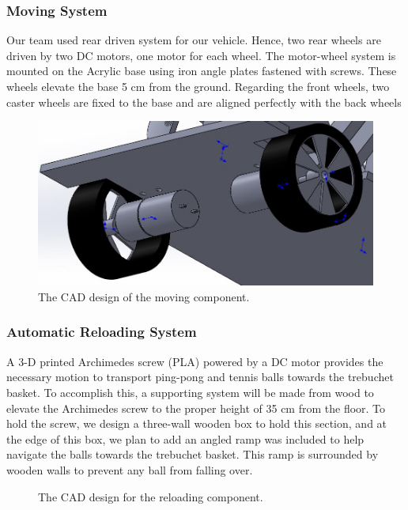 \documentclass{article}
\begin{document}
\subsubsection*{Moving System}
Our team used rear driven system for our vehicle. Hence, two rear wheels are driven by two DC motors, one motor for each wheel. The motor-wheel system is mounted on the Acrylic base using iron angle plates fastened with screws. These wheels elevate the base 5 cm from the ground. Regarding the front wheels, two caster wheels are fixed to the base and are aligned perfectly with the back wheels
\begin{figure}[H]
\centering
\includegraphics[width=0.6\linewidth]{Moving}
\caption{The CAD design of the moving component.}
\end{figure}

\subsubsection*{Automatic Reloading System}
A 3-D printed Archimedes screw (PLA) powered by a DC motor provides the necessary motion to transport ping-pong and tennis balls towards the trebuchet basket. To accomplish this, a supporting system will be made from wood to elevate the Archimedes screw to the proper height of 35 cm from the floor. To hold the screw, we design a three-wall wooden box to hold this section, and at the edge of this box, we plan to add an angled ramp was included to help navigate the balls towards the trebuchet basket. This ramp is surrounded by wooden walls to prevent any ball from falling over.

\begin{figure}[H]
\centering
{}
\caption{The CAD design for the reloading component.}
\end{figure}
\end{document}
